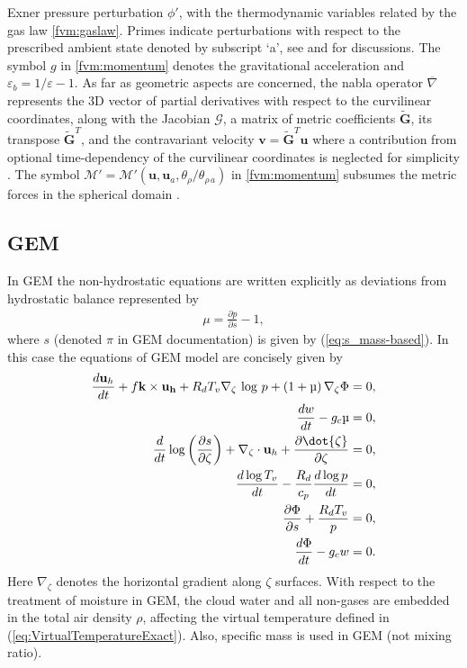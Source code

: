 \documentclass[gmd, manuscript]{copernicus}
\newcommand{\vb}{\mathbf}
\newcommand{\pdiff}[2]{\frac{\partial #1}{\partial #2}}
\begin{document}
Exner pressure perturbation $\phi'$, 
with the thermodynamic variables related by the gas law 
\eqref{fvm:gaslaw}. Primes indicate perturbations with respect to the prescribed ambient state denoted by
subscript `a', see \cite{prusa2008eulag} and \cite{smolarkiewiczJCP2014} for discussions.
The symbol $g$ in \eqref{fvm:momentum} denotes the gravitational acceleration 
and $\varepsilon_b = 1/\varepsilon-1$. As far as geometric aspects 
are concerned, the nabla operator $\overline{\nabla}$ represents
the 3D vector of partial derivatives with respect to the curvilinear coordinates, along with the Jacobian $\mathcal{G}$, 
a matrix of metric coefficients $\mathbf{\widetilde{G}}$, its transpose $\widetilde{\mathbf{G}}^{T}$, and 
the contravariant velocity $\mathbf{v} = \mathbf{\widetilde{G}}^{T}\mathbf{u}$ where a contribution from
optional time-dependency of the curvilinear coordinates is neglected for simplicity \citep{kuehnleinJCP2017}.
The symbol $\mathcal{M}' = \mathcal{M}'(\mathbf{u}, \mathbf{u}_a, \theta_{\rho}/\theta_{\rho\,a})$ in \eqref{fvm:momentum} 
subsumes the metric forces in the spherical domain \citep{smolarkiewiczetalJCP2017}.

\subsection{GEM} \label{sec:GEM_equations}

In GEM the non-hydrostatic equations are written explicitly as deviations from hydrostatic balance represented by
\begin{align}
\mu = \pdiff{p}{s} - 1,
\end{align}
\noindent where $s$ (denoted $\pi$ in GEM documentation) is given by (\ref{eq:s_mass-based}).  In this case the equations of GEM model \citep{Girard2014} are concisely given by
\begin{align}
\frac{d \vb{u}_h }{dt} + f {\bf k} \times {\bf{u}_{h}} + R_d T_v\nabla_\zeta \,  \log\, p+ \left( 1 + \mu \right) \nabla_\zeta {\Phi} &= 0, \\
\frac{d w}{dt}- g_c \mu &= 0, \label{eq:GEMVerticalVelocity} \\
\frac{d}{dt} \log \left( \pdiff{s}{\zeta}\right) + \nabla_{ \zeta }\cdot {\bf u}_{{h}}+\frac{\partial \dot{ \zeta }}{\partial \zeta } &= 0, \\
\frac{d \log T_v}{dt} - \frac{R_d}{c_p} \frac {d \log p} {dt} &= 0, \\
\frac{\partial \Phi}{\partial s} + \frac{R_dT_v}{p} &= 0, \\
\frac{d \Phi}{dt}-  g_c w & = 0.
\end{align}  Here $\nabla_\zeta$ denotes the horizontal gradient along $\zeta$ surfaces.  With respect to the treatment of moisture in GEM, the cloud water and all non-gases are embedded in the total air density $\rho$,
affecting the virtual temperature defined in (\ref{eq:VirtualTemperatureExact}). Also, specific mass is used in GEM (not mixing ratio).    
\end{document}
